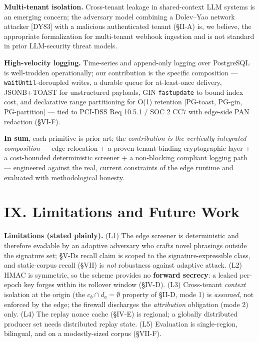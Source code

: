 \textbf{Multi-tenant isolation.} Cross-tenant leakage in shared-context
LLM systems is an emerging concern; the adversary model combining a
Dolev--Yao network attacker {[}DY83{]} with a malicious authenticated
tenant (§II-A) is, we believe, the appropriate formalization for
multi-tenant webhook ingestion and is not standard in prior LLM-security
threat models.

\textbf{High-velocity logging.} Time-series and append-only logging over
PostgreSQL is well-trodden operationally; our contribution is the
specific composition --- \passthrough{\lstinline!waitUntil!}-decoupled
writes, a durable queue for at-least-once delivery, JSONB+TOAST for
unstructured payloads, GIN \passthrough{\lstinline!fastupdate!} to bound
index cost, and declarative range partitioning for O(1) retention
{[}PG-toast, PG-gin, PG-partition{]} --- tied to PCI-DSS Req 10.5.1 /
SOC 2 CC7 with edge-side PAN redaction (§VI-F).

\textbf{In sum}, each primitive is prior art; the \emph{contribution is
the vertically-integrated composition} --- edge relocation + a proven
tenant-binding cryptographic layer + a cost-bounded deterministic
screener + a non-blocking compliant logging path --- engineered against
the real, current constraints of the edge runtime and evaluated with
methodological honesty.

\section{IX. Limitations and Future
Work}\label{ix-limitations-and-future-work}

\textbf{Limitations (stated plainly).} (L1) The edge screener is
deterministic and therefore evadable by an adaptive adversary who crafts
novel phrasings outside the signature set; §V-D\textquotesingle s recall
claim is scoped to the signature-expressible class, and static-corpus
recall (§VII) is \emph{not} robustness against adaptive attack. (L2)
HMAC is symmetric, so the scheme provides no \textbf{forward secrecy}: a
leaked per-epoch key forges within its rollover window (§IV-D). (L3)
Cross-tenant \emph{context} isolation at the origin (the
\(c_b\cap d_a=\emptyset\) property of §II-D, mode 1) is \emph{assumed},
not enforced by the edge; the firewall discharges the \emph{attribution}
obligation (mode 2) only. (L4) The replay nonce cache (§IV-E) is
regional; a globally distributed producer set needs distributed replay
state. (L5) Evaluation is single-region, bilingual, and on a
modestly-sized corpus (§VII-F).

